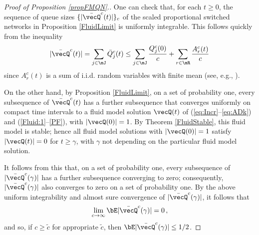 \documentclass{amsart}
\begin{document}
\begin{proof}[Proof of Proposition \ref{propFMQN}.]

One can check that, for each $t\geq 0$, the sequence of queue sizes 
$\{ |\bar{\vecQ}^{c}(t)| \}_c$ of the
scaled proportional switched networks in Proposition \ref{FluidLimit}
is uniformly integrable. This follows quickly from the inequality
\begin{equation}
\label{equnifint}
|\bar{\vecQ}^{c}(t)| =\sum_{j\in\mJ} \bar{Q}_j^{c}(t)\leq \sum_{j\in\mJ} \frac{Q^{c}_j(0)}{c} + \sum_{r\in\mR} \frac{A^{c}_r(t)}{c}
\end{equation}
since $A^{c}_r(t)$ is a sum of i.i.d. random variables with finite mean (see, e.g., \citet[ Lemma 4.13, (4.81)]{Br08}). 

On the other hand, by Proposition \ref{FluidLimit}, on a set of probability one, every subsequence of
$\bar{\vecQ}^{c}(t)$ has a further subsequence that converges uniformly on compact time
 intervals to a fluid model solution $\vecQ(t)$ of (\ref{eq:Incr}--\ref{eq:ADk}) and (\ref{Fluid:1}--\ref{PF}), with $|\vecQ(0)|=1$. By Theorem \ref{FluidStable}, this fluid model is stable; hence all fluid model solutions with $|\vecQ(0)|=1$  satisfy $|\vecQ(t)| = 0$ for $t\ge \gamma$, with $\gamma$ not depending on the particular
fluid model solution. 

It follows from this that, on a set of probability one, every subsequence of 
$|\bar{\vecQ}^{c}(\gamma)|$ has a further subsequence converging to zero; consequently,  
$|\bar{\vecQ}^{c}(\gamma)|$ also converges to zero on a set of probability one. By the above uniform integrability and almost sure convergence of $|\bar{\vecQ}^{c}(\gamma)|$, it follows that
\begin{equation*}
\lim_{c\rightarrow\infty} \bE |\bar{\vecQ}^{c}(\gamma)|  =0\,,
\end{equation*}
and so, if $c\ge \tilde{c}$ for appropriate $\tilde{c}$, then
$\bE |\bar{\vecQ}^{c}(\gamma)|   \le 1/2$.  


\end{proof}
\end{document}
